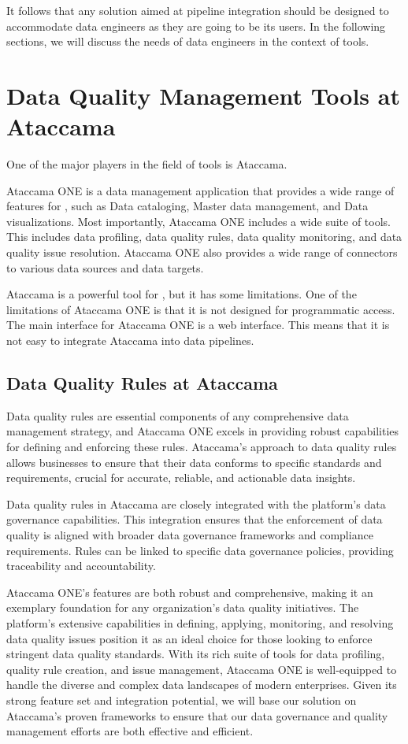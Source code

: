  It follows that any solution aimed at pipeline integration  should be designed to accommodate data engineers as they are going to be its users. In the following sections, we will discuss the needs of data engineers in the context of  tools.

\section{Data Quality Management Tools at Ataccama}

One of the major players in the field of  tools is Ataccama. 

Ataccama ONE is a data management application that provides a wide range of features for , such as Data cataloging, Master data management, and Data visualizations. Most importantly, Ataccama ONE includes a wide suite of  tools. This includes data profiling, data quality rules, data quality monitoring, and data quality issue resolution. Ataccama ONE also provides a wide range of connectors to various data sources and data targets.

Ataccama is a powerful tool for , but it has some limitations. One of the limitations of Ataccama ONE is that it is not designed for programmatic access. The main interface for Ataccama ONE is a web interface. This means that it is not easy to integrate Ataccama into data pipelines.

\subsection{Data Quality Rules at Ataccama}

Data quality rules are essential components of any comprehensive data management strategy, and Ataccama ONE excels in providing robust capabilities for defining and enforcing these rules. Ataccama's approach to data quality rules allows businesses to ensure that their data conforms to specific standards and requirements, crucial for accurate, reliable, and actionable data insights.

Data quality rules in Ataccama are closely integrated with the platform's data governance capabilities. This integration ensures that the enforcement of data quality is aligned with broader data governance frameworks and compliance requirements. Rules can be linked to specific data governance policies, providing traceability and accountability.

Ataccama ONE's  features are both robust and comprehensive, making it an exemplary foundation for any organization's data quality initiatives. The platform's extensive capabilities in defining, applying, monitoring, and resolving data quality issues position it as an ideal choice for those looking to enforce stringent data quality standards. With its rich suite of tools for data profiling, quality rule creation, and issue management, Ataccama ONE is well-equipped to handle the diverse and complex data landscapes of modern enterprises. Given its strong feature set and integration potential, we will base our solution on Ataccama's proven frameworks to ensure that our data governance and quality management efforts are both effective and efficient.


